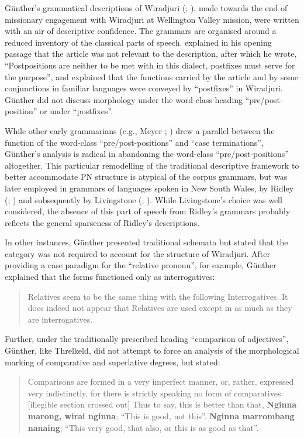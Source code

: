 Günther’s grammatical descriptions of Wiradjuri (\citeyear{gunther_native_1838}; \citeyear{gunther_lecture_1840}), made towards the end of missionary engagement with Wiradjuri at Wellington Valley mission, were written with an air of descriptive confidence. The grammars are organised around a reduced inventory of the classical parts of speech. \citet[13]{gunther_native_1838} explained in his opening passage that the article was not relevant to the description, after which he wrote, “Postpositions are neither to be met with in this dialect, postfixes must serve for the purpose”, and explained that the functions carried by the article and by some conjunctions in familiar languages were conveyed by “postfixes” in Wiradjuri. Günther did not discuss morphology under the word-class heading “pre/post-position” or under ``postfixes''. 

While other early grammarians (e.g., Meyer \citeyear{meyer_vocabulary_1843}; ) drew a parallel between the function of the word-class “pre/post-positions” and ``case terminations'', Günther’s analysis is radical in abandoning the word-class “pre/post-po\-si\-tions” altogether. This particular remodelling of the traditional descriptive framework to better accommodate PN structure is atypical of the corpus grammars, but was later employed in grammars of languages spoken in New South Wales, by Ridley (\citeyear{ridley_kamilaroi_1875}; ) and subsequently by Livingstone (\citeyear{livingstone_grammar_1892}; ). While Livingstone’s choice was well considered, the absence of this part of speech from Ridley’s grammars probably reflects the general sparseness of Ridley’s descriptions.

In other instances, Günther presented traditional schemata but stated that the category was not required to account for the structure of Wiradjuri. After providing a case paradigm for the ``relative pronoun'', for example, Günther explained that the forms functioned only as interrogatives: 
\begin{quote}
    Relatives seem to be the same thing with the following Interrogatives. It does indeed not appear that Relatives are used except in as much as they are interrogatives. \citep[32]{gunther_native_1838}
\end{quote}

Further, under the traditionally prescribed heading “comparison of adjectives'', Günther, like Threlkeld, did not attempt to force an analysis of the morphological marking of comparative and superlative degrees, but stated: 
\begin{quote}
    Comparisons are formed in a very imperfect manner, or, rather, expressed very indistinctly, for there is strictly speaking no form of comparatives [illegible section crossed out] Thus to say, this is better than that, \textbf{Ngin\-na marong, wirai nginna}; ``This is good, not this''. \textbf{Nginna marrombang na\-naing}; ``This very good, that also, or this is as good as that''. \citep[10]{threlkeld_australian_1834}
\end{quote}

